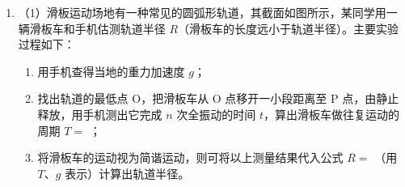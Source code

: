 \documentclass[\gkver]{gaokaozhenti}
\begin{document}
\begin{enumerate}
{B．根据右手定则可知，金属棒 a 第一次穿过磁场时回路中有逆时针方向的感应电流，故 B 正确；

C．电路中产生的平均电动势为 $\overline{E}=\frac{\Delta\Phi}{\Delta t}=\frac{BLd}{\Delta t}$，平均电流为 $\overline{I}=\frac{\overline{E}}{2R}$，金属棒 a 受到的安培力为 $\overline{F}=B\overline{I}d$。规定向右为正方向，对金属棒 a，根据动量定理得 $-B\overline{I}d\cdot\Delta t=m_{a}v_{a}-m_{a}v_{0}$，解得金属棒第一次离开磁场时速度 $v_{a}=1.5\Ums$。金属棒 a 第一次穿过磁场区域的过程中，电路中产生的总热量等于金属棒 a 机械能的减少量，即 $Q=\frac{1}{2}m_{a}v_{0}^{2}-\frac{1}{2}m_{a}v_{a}^{2}$，联立并代入数据得 $Q=0.6875\UJ$。由于两棒电阻相同，两棒产生的焦耳热相同，则金属棒 b 上产生的焦耳热 $Q_{b}=\frac{Q}{2}=0.34375\UJ$，故 C 错误；

D．规定向右为正方向，两金属棒碰撞过程根据动量守恒和机械能守恒得 $m_{a}v_{a}=m_{a}v_{a}'+m_{b}v_{b}$，$\frac{1}{2}m_{a}v_{a}^{2}=\frac{1}{2}m_{a}v_{a}'^{2}+\frac{1}{2}m_{b}v_{b}^{2}$，联立并代入数据解得金属棒 a 反弹的速度为 $v_{a}'=-0.5\Ums$。设金属棒 a 最终停在距磁场左边界 $x$ 处，则从反弹进入磁场到停下来的过程，电路中产生的平均电动势为 $\overline{E}'=\frac{\Delta\Phi'}{\Delta t'}=\frac{B(L-x)d}{\Delta t'}$，平均电流为 $\overline{I}'=\frac{\overline{E}'}{2R}$，金属棒 a 受到的安培力为 $\overline{F}'=B\overline{I}'d$，规定向右为正方向，对金属棒 a，根据动量定理得 $-B\overline{I}'d\cdot\Delta t=0-m_{a}v_{a}'$，联立并代入数据解得 $x=0.8\Um$，故 D 正确。

故选 BD。
}

\item
（1）滑板运动场地有一种常见的圆弧形轨道，其截面如图所示，某同学用一辆滑板车和手机估测轨道半径 $R$（滑板车的长度远小于轨道半径）。主要实验过程如下：
\begin{enumerate}
	\item
	用手机查得当地的重力加速度 $g$；
	\item
	找出轨道的最低点 O，把滑板车从 O 点移开一小段距离至 P 点，由静止释放，用手机测出它完成 $n$ 次全振动的时间 $t$，算出滑板车做往复运动的周期 $T=$ ；
	\item
	将滑板车的运动视为简谐运动，则可将以上测量结果代入公式 $R=$ （用 $T$、$g$ 表示）计算出轨道半径。
\end{enumerate}



\end{enumerate}
\end{document}

